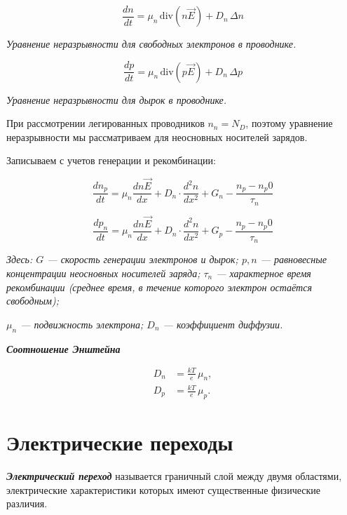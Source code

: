 \documentclass[../main.tex]{subfiles}
\begin{document}
\[
\boxed{
\frac{d n}{d t} = \mu_n \, \mathrm{div}(n \vec{E}) + D_n \, \Delta n
}
\]
\begin{center}
\textit{Уравнение неразрывности для свободных электронов в проводнике.}
\end{center}

\[
\boxed{
\frac{d p}{d t} = \mu_n \, \mathrm{div}(p \vec{E}) + D_n \, \Delta p
}
\]
\begin{center}
\textit{Уравнение неразрывности для дырок в проводнике.}
\end{center}



При рассмотрении легированных проводников $n_n = N_D$, поэтому уравнение неразрывности мы рассматриваем для неосновных носителей зарядов.

Записываем с учетов генерации и рекомбинации:

\[\frac{d n_p}{d t} = \mu_n \frac{d n \vec E}{dx} + D_n \cdot \frac{d^2 n}{dx^2}+ G_n - \frac{n_p - n_p0}{\tau_n}\]

\[\frac{d p_n}{d t} = \mu_n \frac{d n \vec E}{dx} + D_n \cdot \frac{d^2 n}{dx^2}+ G_p - \frac{n_p - n_p0}{\tau_n}\]

\begin{center}
    \textit{Здесь: $G$ — скорость генерации электронов и дырок; $p, n$ — равновесные концентрации неосновных носителей заряда; 
    $\tau_n$ — характерное время рекомбинации (среднее время, в течение которого электрон остаётся свободным);}
    
    \textit{$\mu_n$ — подвижность электрона; $D_n$ — коэффициент диффузии.}
    \end{center}

\textbf{\textit{Соотношение Энштейна}}

\[
\boxed{
\begin{aligned}
D_n &= \frac{kT}{e} \, \mu_n, \\[6pt]
D_p &= \frac{kT}{e} \, \mu_p.
\end{aligned}
}
\]

\section{Электрические переходы}

 \textit{\textbf{Электрический переход}} называется граничный слой между двумя областями, электрические характеристики которых имеют существенные физические различия.

\vspace{10px}
\end{document}
